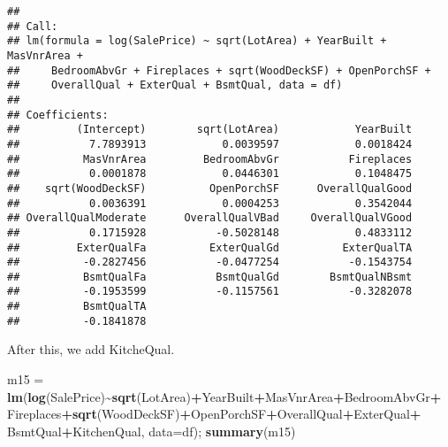 \documentclass[
]{article}
\newenvironment{Shaded}{\begin{snugshade}}{\end{snugshade}}
\newcommand{\AttributeTok}[1]{\textcolor[rgb]{0.13,0.29,0.53}{#1}}
\newcommand{\FunctionTok}[1]{\textcolor[rgb]{0.13,0.29,0.53}{\textbf{#1}}}
\newcommand{\NormalTok}[1]{#1}
\newcommand{\OtherTok}[1]{\textcolor[rgb]{0.56,0.35,0.01}{#1}}
\newcommand{\SpecialCharTok}[1]{\textcolor[rgb]{0.81,0.36,0.00}{\textbf{#1}}}
\begin{document}
\begin{verbatim}
## 
## Call:
## lm(formula = log(SalePrice) ~ sqrt(LotArea) + YearBuilt + MasVnrArea + 
##     BedroomAbvGr + Fireplaces + sqrt(WoodDeckSF) + OpenPorchSF + 
##     OverallQual + ExterQual + BsmtQual, data = df)
## 
## Coefficients:
##         (Intercept)        sqrt(LotArea)            YearBuilt  
##           7.7893913            0.0039597            0.0018424  
##          MasVnrArea         BedroomAbvGr           Fireplaces  
##           0.0001878            0.0446301            0.1048475  
##    sqrt(WoodDeckSF)          OpenPorchSF      OverallQualGood  
##           0.0036391            0.0004253            0.3542044  
## OverallQualModerate      OverallQualVBad     OverallQualVGood  
##           0.1715928           -0.5028148            0.4833112  
##         ExterQualFa          ExterQualGd          ExterQualTA  
##          -0.2827456           -0.0477254           -0.1543754  
##          BsmtQualFa           BsmtQualGd        BsmtQualNBsmt  
##          -0.1953599           -0.1157561           -0.3282078  
##          BsmtQualTA  
##          -0.1841878
\end{verbatim}

After this, we add KitcheQual.

\begin{Shaded}
\begin{Highlighting}[]
\NormalTok{m15 }\OtherTok{=} \FunctionTok{lm}\NormalTok{(}\FunctionTok{log}\NormalTok{(SalePrice)}\SpecialCharTok{\textasciitilde{}}\FunctionTok{sqrt}\NormalTok{(LotArea)}\SpecialCharTok{+}\NormalTok{YearBuilt}\SpecialCharTok{+}\NormalTok{MasVnrArea}\SpecialCharTok{+}\NormalTok{BedroomAbvGr}\SpecialCharTok{+}
\NormalTok{           Fireplaces}\SpecialCharTok{+}\FunctionTok{sqrt}\NormalTok{(WoodDeckSF)}\SpecialCharTok{+}\NormalTok{OpenPorchSF}\SpecialCharTok{+}\NormalTok{OverallQual}\SpecialCharTok{+}\NormalTok{ExterQual}\SpecialCharTok{+}
\NormalTok{           BsmtQual}\SpecialCharTok{+}\NormalTok{KitchenQual, }\AttributeTok{data=}\NormalTok{df); }\FunctionTok{summary}\NormalTok{(m15)}
\end{Highlighting}
\end{Shaded}
\end{document}

